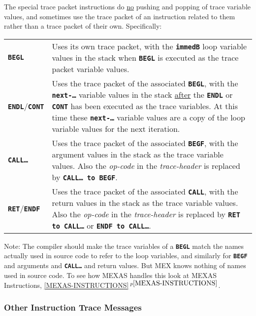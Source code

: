 \documentclass[12pt]{article}
\newcommand{\TT}[1]{{\tt \bfseries #1}}
\newcommand{\itemref}[1]{\ref{#1}$\,^{p\pageref{#1}}$}
\begin{document}
The special trace packet instructions do \underline{no} pushing and popping
of trace variable values, and sometimes use the trace packet
of an instruction related to them rather than a trace packet of their
own.  Specifically:

\begin{center}
\begin{tabular}{lp{4.0in}}
\TT{BEGL}  & Uses its own trace packet, with the \TT{immedB} loop variable
             values in the stack when \TT{BEGL} is executed as the trace packet 
	     variable values.
\\[0.5ex]
\TT{ENDL}/\TT{CONT}  & Uses the trace packet of the associated \TT{BEGL},
                       with the \TT{next-\ldots} variable values in the
		       stack \underline{after} the \TT{ENDL} or \TT{CONT}
		       has been executed as the trace variables.
		       At this time these \TT{next-\ldots} variable values
		       are a copy of the loop variable values for the next
		       iteration.
\\[0.5ex]
\TT{CALL\ldots}  & Uses the trace packet of the associated \TT{BEGF},
                   with the argument values in the stack as the trace
		   variable values. 
		   Also the {\em op-code}
		   in the {\em trace-header} is replaced by
		   \TT{CALL\ldots{}~to BEGF}\label{CALL-TO-BEGF}.
\\[0.5ex]
\TT{RET}/\TT{ENDF}  & Uses the trace packet of the associated \TT{CALL},
                   with the return values in the stack as the trace
		   variable values.
		   Also the {\em op-code}
		   in the {\em trace-header} is replaced by
		   \TT{RET to CALL\ldots}\label{RET-TO-CALL}
		   or \TT{ENDF to CALL\ldots}.
\end{tabular}
\end{center}

Note: The compiler should make the trace variables of a \TT{BEGL}
match the names actually used in source code to refer to the loop
variables, and similarly for \TT{BEGF} and arguments and \TT{CALL\ldots}
and return values.
But MEX knows nothing of names used in source code.
To see how MEXAS handles this look at MEXAS Instructions,
\itemref{MEXAS-INSTRUCTIONS}.



\subsubsection{Other Instruction Trace Messages}
\label{OTHER-INSTRUCTION-TRACE-MESSAGES}
\end{document}
